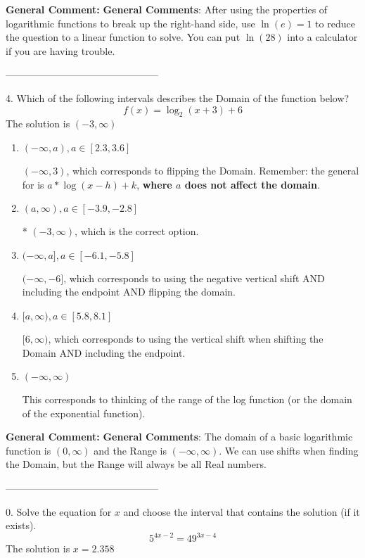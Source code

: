 \documentclass{extbook}[14pt]
\begin{document}
\textbf{General Comment:} \textbf{General Comments}: After using the properties of logarithmic functions to break up the right-hand side, use $\ln(e) = 1$ to reduce the question to a linear function to solve. You can put $\ln(28)$ into a calculator if you are having trouble. 

-----------------------------------------------

4. Which of the following intervals describes the Domain of the function below?
\[ f(x) = \log_2{(x+3)}+6 \] 
The solution is $ (-3, \infty) $ 

\begin{enumerate}[label=\Alph*.] 
\item $ (-\infty, a), a \in [2.3, 3.6] $ 

 $(-\infty, 3)$, which corresponds to flipping the Domain. Remember: the general for is $a*\log(x-h)+k$, \textbf{where $a$ does not affect the domain}. 
\item $ (a, \infty), a \in [-3.9, -2.8] $ 

 * $(-3, \infty)$, which is the correct option. 
\item $ (-\infty, a], a \in [-6.1, -5.8] $ 

 $(-\infty, -6]$, which corresponds to using the negative vertical shift AND including the endpoint AND flipping the domain. 
\item $ [a, \infty), a \in [5.8, 8.1] $ 

 $[6, \infty)$, which corresponds to using the vertical shift when shifting the Domain AND including the endpoint. 
\item $ (-\infty, \infty) $ 

 This corresponds to thinking of the range of the log function (or the domain of the exponential function). 
\end{enumerate} 
 
\textbf{General Comment:} \textbf{General Comments}: The domain of a basic logarithmic function is $(0, \infty)$ and the Range is $(-\infty, \infty)$. We can use shifts when finding the Domain, but the Range will always be all Real numbers. 

-----------------------------------------------

0. Solve the equation for $x$ and choose the interval that contains the solution (if it exists).
\[ 5^{4x-2} = 49^{3x-4} \] 
The solution is $ x = 2.358 $ 
\end{document}
